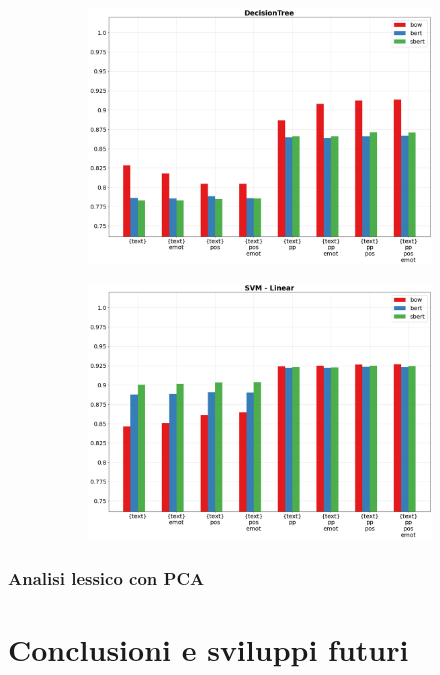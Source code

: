 \documentclass[oneside]{book}
\begin{document}
\begin{figure}[!h]
	\hspace*{-3cm}
	\begin{subfigure}[b]{0.5\textwidth}
		\centering
		\includegraphics[width=10cm]{assets/reports/text/f1/DecisionTree.png}
	\end{subfigure}
	\hfill
	\begin{subfigure}[b]{0.5\textwidth}		
		\centering
		\hspace*{0.15cm}
		\includegraphics[width=10cm]{assets/reports/text/f1/SVM - Linear.png}
	\end{subfigure}
\end{figure}
\newpage


\subsection{Analisi lessico con PCA}


\chapter{Conclusioni e sviluppi futuri}
\end{document}

